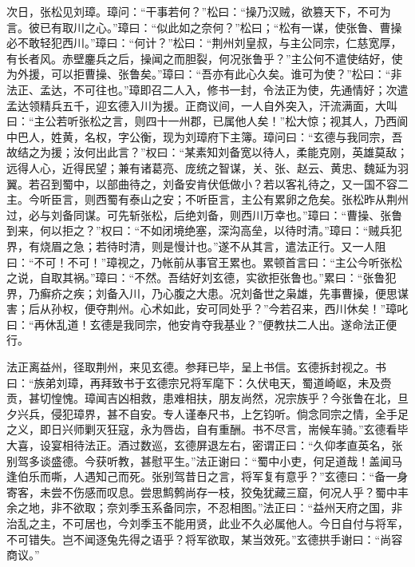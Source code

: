 次日，张松见刘璋。璋问：“干事若何？”松曰：“操乃汉贼，欲篡天下，不可为言。彼已有取川之心。”璋曰：“似此如之奈何？”松曰；“松有一谋，使张鲁、曹操必不敢轻犯西川。”璋曰：“何计？”松曰：“荆州刘皇叔，与主公同宗，仁慈宽厚，有长者风。赤壁鏖兵之后，操闻之而胆裂，何况张鲁乎？”主公何不遣使结好，使为外援，可以拒曹操、张鲁矣。”璋曰：“吾亦有此心久矣。谁可为使？”松曰：“非法正、孟达，不可往也。”璋即召二人入，修书一封，令法正为使，先通情好；次遣孟达领精兵五千，迎玄德入川为援。正商议间，一人自外突入，汗流满面，大叫曰：“主公若听张松之言，则四十一州郡，已属他人矣！”松大惊；视其人，乃西阆中巴人，姓黄，名权，字公衡，现为刘璋府下主簿。璋问曰：“玄德与我同宗，吾故结之为援；汝何出此言？”权曰：“某素知刘备宽以待人，柔能克刚，英雄莫敌；远得人心，近得民望；兼有诸葛亮、庞统之智谋，关、张、赵云、黄忠、魏延为羽翼。若召到蜀中，以部曲待之，刘备安肯伏低做小？若以客礼待之，又一国不容二主。今听臣言，则西蜀有泰山之安；不听臣言，主公有累卵之危矣。张松昨从荆州过，必与刘备同谋。可先斩张松，后绝刘备，则西川万幸也。”璋曰：“曹操、张鲁到来，何以拒之？”权曰：“不如闭境绝塞，深沟高垒，以待时清。”璋曰：“贼兵犯界，有烧眉之急；若待时清，则是慢计也。”遂不从其言，遣法正行。又一人阻曰：“不可！不可！”璋视之，乃帐前从事官王累也。累顿首言曰：“主公今听张松之说，自取其祸。”璋曰：“不然。吾结好刘玄德，实欲拒张鲁也。”累曰：“张鲁犯界，乃癣疥之疾；刘备入川，乃心腹之大患。况刘备世之枭雄，先事曹操，便思谋害；后从孙权，便夺荆州。心术如此，安可同处乎？”今若召来，西川休矣！”璋叱曰：“再休乱道！玄德是我同宗，他安肯夺我基业？”便教扶二人出。遂命法正便行。

法正离益州，径取荆州，来见玄德。参拜已毕，呈上书信。玄德拆封视之。书曰：“族弟刘璋，再拜致书于玄德宗兄将军麾下：久伏电天，蜀道崎岖，未及赍贡，甚切惶愧。璋闻吉凶相救，患难相扶，朋友尚然，况宗族乎？今张鲁在北，旦夕兴兵，侵犯璋界，甚不自安。专人谨奉尺书，上乞钧听。倘念同宗之情，全手足之义，即日兴师剿灭狂寇，永为唇齿，自有重酬。书不尽言，耑候车骑。”玄德看毕大喜，设宴相待法正。酒过数巡，玄德屏退左右，密谓正曰：“久仰孝直英名，张别驾多谈盛德。今获听教，甚慰平生。”法正谢曰：“蜀中小吏，何足道哉！盖闻马逢伯乐而嘶，人遇知己而死。张别驾昔日之言，将军复有意乎？”玄德曰：“备一身寄客，未尝不伤感而叹息。尝思鹪鹩尚存一枝，狡兔犹藏三窟，何况人乎？蜀中丰余之地，非不欲取；奈刘季玉系备同宗，不忍相图。”法正曰：“益州天府之国，非治乱之主，不可居也，今刘季玉不能用贤，此业不久必属他人。今日自付与将军，不可错失。岂不闻逐兔先得之语乎？将军欲取，某当效死。”玄德拱手谢曰：“尚容商议。”

